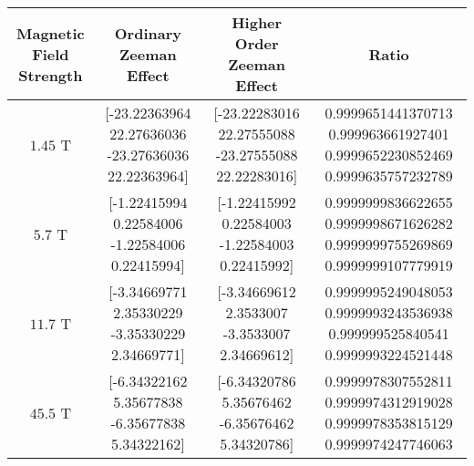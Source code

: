 \documentclass{article}
\begin{document}
    \begin{landscape}
        \begin{table}
            \centering
            \begin{tabular}{|c|c|c|c|}
                \hline
                Magnetic Field Strength & Ordinary Zeeman Effect & Higher Order Zeeman Effect & Ratio \\
                \hline
                $1.45$ T & [-23.22363964  22.27636036 -23.27636036  22.22363964] & [-23.22283016  22.27555088 -23.27555088  22.22283016] & 0.9999651441370713 0.999963661927401 0.9999652230852469 0.9999635757232789 \\
                $5.7$ T  & [-1.22415994  0.22584006 -1.22584006  0.22415994] & [-1.22415992  0.22584003 -1.22584003  0.22415992]     & 0.9999999836622655 0.9999998671626282 0.9999999755269869 0.9999999107779919 \\
                $11.7$ T & [-3.34669771  2.35330229 -3.35330229  2.34669771] & [-3.34669612  2.3533007  -3.3533007   2.34669612] & 0.9999995249048053 0.9999993243536938 0.999999525840541 0.9999993224521448 \\
                $45.5$ T & [-6.34322162  5.35677838 -6.35677838  5.34322162] & [-6.34320786  5.35676462 -6.35676462  5.34320786] & 0.9999978307552811 0.9999974312919028 0.9999978353815129 0.9999974247746063 \\
                \hline
            \end{tabular}
        \end{table}
    \end{landscape}
\end{document}
